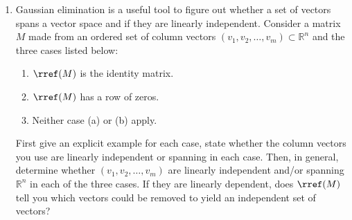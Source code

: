 \begin{enumerate}
\item
Gaussian elimination is a useful tool to figure out whether a set of vectors spans a vector space and if they are linearly independent.
Consider a matrix $M$ made from an ordered set of column vectors $(v_1,v_2,\ldots,v_m)\subset {\mathbb R}^n$ and the three cases listed below:
\begin{enumerate}
\item $\rref(M)$ is the identity matrix.
\item $\rref(M)$ has a row of zeros.
\item Neither case (a)  or (b) apply.
\end{enumerate}
First give an explicit example for each case,
state whether the column vectors you use are linearly independent or spanning in each case.
 Then, in general, determine whether $(v_1,v_2,\ldots,v_m)$ are linearly independent and/or spanning ${\mathbb R}^n$
 in each of the three cases. If they are linearly dependent, does $\rref(M)$ tell you which vectors could be 
 removed to yield an independent set of vectors?
\end{enumerate}

